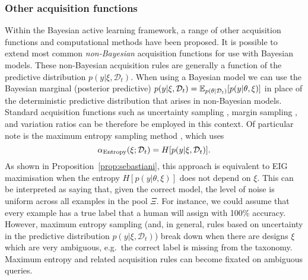 \documentclass[a4paper, 10pt]{report}
\theoremstyle{plain}
\begin{document}
	
	\subsubsection{Other acquisition functions}
	
	Within the Bayesian active learning framework, a range of other acquisition functions and computational methods have been proposed.
	It is possible to extend most common \emph{non-Bayesian} acquisition functions for use with Bayesian models.
	These non-Bayesian acquisition rules are generally a function of the predictive distribution $p(y|\xi,\mathcal{D}_t)$. When using a Bayesian model we can use the Bayesian marginal (posterior predictive) $p(y|\xi,\mathcal{D}_t) = \mathbb{E}_{p(\theta|\mathcal{D}_t)}[p(y|\theta,\xi)]$ in place of the deterministic predictive distribution that arises in non-Bayesian models.
	Standard acquisition functions such as uncertainty sampling \citep{lewis1994sequential}, margin sampling \citep{scheffer2001active}, and variation ratios \citep{freeman1965elementary} can be therefore be employed in this context.
	Of particular note is the maximum entropy sampling method \citep{shannon1948mathematical,settles2008analysis}, which uses 
	\begin{equation}
	\alpha_{\textup{Entropy}}(\xi;\mathcal{D}_t) = H[p(y|\xi,\mathcal{D}_t)].
	\end{equation}
	As shown in Proposition~\ref{prop:sebastiani}, this approach is equivalent to EIG maximisation when the entropy $H[p(y|\theta,\xi)]$ does not depend on $\xi$. This can be interpreted as saying that, given the correct model, the level of noise is uniform across all examples in the pool $\Xi$. For instance, we could assume that every example has a true label that a human will assign with 100\% accuracy.
	However, maximum entropy sampling (and, in general, rules based on uncertainty in the predictive distribution $p(y|\xi,\mathcal{D}_t)$) break down when there are designs $\xi$ which are very ambiguous, e.g.~the correct label is missing from the taxonomy. Maximum entropy and related acquisition rules can become fixated on ambiguous queries.
	
\end{document}
